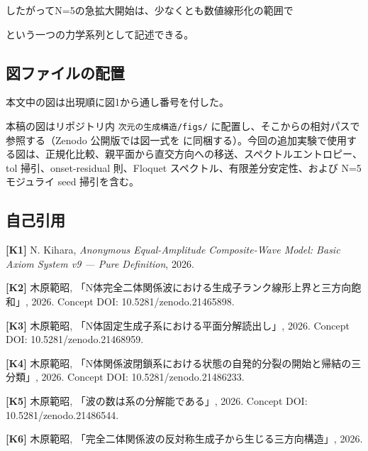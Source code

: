 \documentclass[
  a4paper,
]{ltjsarticle}
\begin{document}
したがってN=5の急拡大開始は、少なくとも数値線形化の範囲で

\begin{center}\end{center}

という一つの力学系列として記述できる。

\subsection{図ファイルの配置}\label{ux56f3ux30d5ux30a1ux30a4ux30ebux306eux914dux7f6e}

本文中の図は出現順に図1から通し番号を付した。

本稿の図はリポジトリ内 \texttt{次元の生成構造/figs/}
に配置し、そこからの相対パスで参照する（Zenodo 公開版では図一式を
に同梱する）。今回の追加実験で使用する図は、正規化比較、親平面から直交方向への移送、スペクトルエントロピー、tol
掃引、onset-residual 則、Floquet スペクトル、有限差分安定性、および N=5
モジュライ seed 掃引を含む。

\subsection{自己引用}\label{ux81eaux5df1ux5f15ux7528}

\textbf{{[}K1{]}} N. Kihara, \emph{Anonymous Equal-Amplitude
Composite-Wave Model: Basic Axiom System v9 --- Pure Definition}, 2026.

\textbf{{[}K2{]}} 木原範昭,
「N体完全二体関係波における生成子ランク線形上界と三方向飽和」, 2026.
Concept DOI: 10.5281/zenodo.21465898.

\textbf{{[}K3{]}} 木原範昭, 「N体固定生成子系における平面分解読出し」,
2026. Concept DOI: 10.5281/zenodo.21468959.

\textbf{{[}K4{]}} 木原範昭,
「N体関係波閉鎖系における状態の自発的分裂の開始と帰結の三分類」, 2026.
Concept DOI: 10.5281/zenodo.21486233.

\textbf{{[}K5{]}} 木原範昭, 「波の数は系の分解能である」, 2026. Concept
DOI: 10.5281/zenodo.21486544.

\textbf{{[}K6{]}} 木原範昭,
「完全二体関係波の反対称生成子から生じる三方向構造」, 2026.
\end{document}

